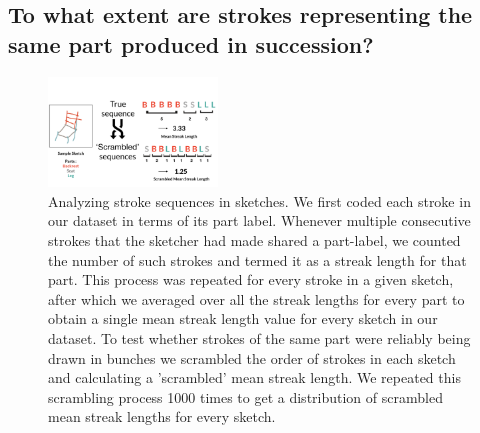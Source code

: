 \documentclass[10pt,letterpaper]{article}
\begin{document}

\subsection{To what extent are strokes representing the same part produced in succession?}

\begin{figure}
\centering
\includegraphics[width=0.4\textwidth]{figures/part_sequence.pdf}
\caption{Analyzing stroke sequences in sketches. We first coded each stroke in our dataset in terms of its part label. Whenever multiple consecutive strokes that the sketcher had made shared a part-label, we counted the number of such strokes and termed it as a streak length for that part. This process was repeated for every stroke in a given sketch, after which we averaged over all the streak lengths for every part to obtain a single mean streak length value for every sketch in our dataset. To test whether strokes of the same part were reliably being drawn in bunches we scrambled the order of strokes in each sketch and calculating a 'scrambled' mean streak length. We repeated this scrambling process 1000 times to get a distribution of scrambled mean streak lengths for every sketch.}
\label{stroke_sequence_fig}
\end{figure}
\end{document}
